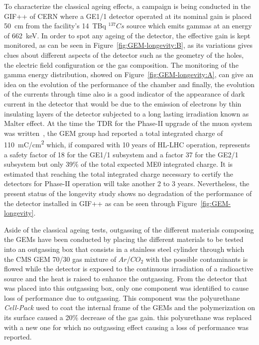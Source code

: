 	To characterize the classical ageing effects, a campaign is being conducted in the \acf{GIF++} of CERN where a GE1/1 detector operated at its nominal gain is placed \SI{50}{cm} from the facility's \SI{14}{TBq} $^{137}Cs$ source which emits gammas at an energy of \SI{662}{keV}. In order to spot any ageing of the detector, the effective gain is kept monitored, as can be seen in Figure~\ref{fig:GEM-longevity:B}, as its variations gives clues about different aspects of the detector such as the geometry of the holes, the electric field configuration or the gas composition. The monitoring of the gamma energy distribution, showed on Figure~\ref{fig:GEM-longevity:A}, can give an idea on the evolution of the performance of the chamber and finally, the evolution of the currents through time also is a good indicator of the appearance of dark current in the detector that would be due to the emission of electrons by thin insulating layers of the detector subjected to a long lasting irradiation known as Malter effect. At the time the \acf{TDR} for the Phase-II upgrade of the muon system was written~\cite{PHASEIITP}, the GEM group had reported a total integrated charge of \SI{110}{mC/cm^2} which, if compared with 10 years of HL-LHC operation, represents a safety factor of 18 for the GE1/1 subsystem and a factor 37 for the GE2/1 subsystem but only 39\% of the total expected ME0 integrated charge. It is estimated that reaching the total integrated charge necessary to certify the detectors for Phase-II operation will take another 2 to 3 years. Nevertheless, the present status of the longevity study shows no degradation of the performance of the detector installed in GIF++ as can be seen through Figure~\ref{fig:GEM-longevity}.
	
	Aside of the classical ageing tests, outgassing of the different materials composing the GEMs have been conducted by placing the different materials to be tested into an outgassing box that consists in a stainless steel cylinder through which the CMS GEM 70/30 gas mixture of $Ar$/$CO_2$ with the possible contaminants is flowed while the detector is exposed to the continuous irradiation of a radioactive source and the heat is raised to enhance the outgassing. From the detector that was placed into this outgassing box, only one component was identified to cause loss of performance due to outgassing. This component was the polyurethane \textit{Cell-Pack} used to coat the internal frame of the GEMs and the polymerization on its surface caused a 20\% decrease of the gas gain. this polyurethane was replaced with a new one for which no outgassing effect causing a loss of performance was reported.
	
